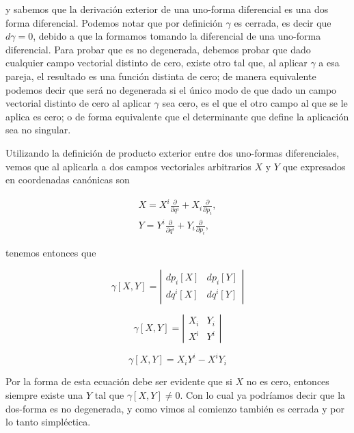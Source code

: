 \documentclass[a4paper,10pt]{article}
\numberwithin{equation}{section}
\begin{document}
y sabemos que la derivación exterior de una uno-forma diferencial es una dos forma 
diferencial. Podemos notar que por definición $\gamma$ es cerrada, es decir que 
$d\gamma = 0$, debido a que la formamos tomando la diferencial de una uno-forma 
diferencial. Para probar que es no degenerada, debemos probar que dado cualquier 
campo vectorial distinto de cero, existe otro tal que, al aplicar $\gamma$ a esa pareja, 
el resultado es una función distinta de cero; de manera equivalente podemos decir 
que será no degenerada si el único modo de que dado un campo vectorial distinto de 
cero al aplicar $\gamma$ sea cero, es el que el otro campo al que se le aplica 
es cero; o de forma equivalente que el determinante que define la aplicación 
sea no singular. 

\vspace{.3cm}

Utilizando la definición de producto exterior entre dos uno-formas diferenciales, vemos 
que al aplicarla a dos campos vectoriales arbitrarios $X$ y $Y$ que expresados 
en coordenadas canónicas son 

\begin{align}
 X = X^i\frac{\partial}{\partial q^i} + X_i\frac{\partial}{\partial p_i}, \\
 Y = Y^i\frac{\partial}{\partial q^i} + Y_i\frac{\partial}{\partial p_i},
\end{align}

tenemos entonces que

\begin{equation}
 \gamma[X,Y] = \left|\begin{matrix}
                dp_i[X] & dp_i[Y] \\
                dq^i[X] & dq^i[Y]
               \end{matrix}\right|
\end{equation}

\begin{equation}
 \gamma[X,Y] = \left|\begin{matrix}
                X_i & Y_i \\
                X^i & Y^i
               \end{matrix}\right|
\end{equation}

\begin{equation}
 \gamma[X,Y] = X_i Y^i - X^iY_i
\end{equation}

Por la forma de esta ecuación debe ser evidente que si $X$ no es cero, entonces 
siempre existe una $Y$ tal que $\gamma[X,Y] \ne 0$. Con lo cual ya podríamos decir 
que la dos-forma es no degenerada, y como vimos al comienzo también es cerrada 
y por lo tanto simpléctica. 
\end{document}
